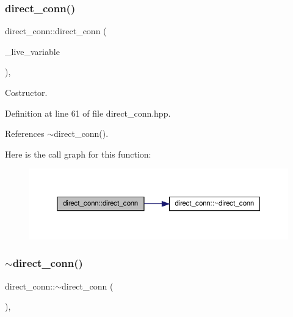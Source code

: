 \subsubsection{\texorpdfstring{direct\+\_\+conn()}{direct\_conn()}}
{\footnotesize\ttfamily direct\+\_\+conn\+::direct\+\_\+conn (\begin{DoxyParamCaption}\item[{const \hyperlink{classCustomOrderedSet}{Custom\+Ordered\+Set}$<$ \hyperlink{conn__binding_8hpp_ae44ffa64566f2bb3ce6941833ac940fb}{data\+\_\+transfer} $>$ \&}]{\+\_\+live\+\_\+variable }\end{DoxyParamCaption})\hspace{0.3cm}{\ttfamily [inline]}, {\ttfamily [explicit]}}



Costructor. 



Definition at line 61 of file direct\+\_\+conn.\+hpp.



References $\sim$direct\+\_\+conn().

Here is the call graph for this function\+:
\nopagebreak
\begin{figure}[H]
\begin{center}
\leavevmode
\includegraphics[width=350pt]{d2/dac/classdirect__conn_a25cb6f6c42b03bddf31f07306e7300dd_cgraph}
\end{center}
\end{figure}
\mbox{\label{classdirect__conn_ae86d358d318711ea9e3cf6f658f75e07}} 
\subsubsection{\texorpdfstring{$\sim$direct\+\_\+conn()}{~direct\_conn()}}
{\footnotesize\ttfamily direct\+\_\+conn\+::$\sim$direct\+\_\+conn (\begin{DoxyParamCaption}{ }\end{DoxyParamCaption})\hspace{0.3cm}{\ttfamily [override]}, {\ttfamily [default]}}



